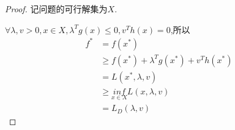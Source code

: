 \documentclass[UTF8]{ctexart}
\theoremstyle{Defination}
\theoremstyle{remark}
\begin{document}
\begin{proof}
记问题的可行解集为$X$.

$\forall\lambda,v>0,x\in X,\lambda^Tg(x)\leq0,v^Th(x)=0$,所以
\begin{align*}
f^* & =f(x^*) \\
 & \geq f(x^*)+\lambda^Tg(x^*)+v^Th(x^*) \\
 & =L(x^*,\lambda,v) \\
 & \geq\underset{x\in X}{inf}{L(x,\lambda,v)} \\
 & =L_D(\lambda,v)
\end{align*}
\end{proof}



\end{document}
